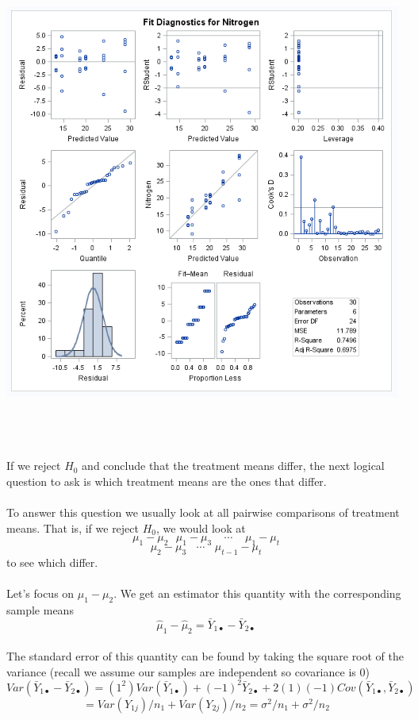 	\begin{center}
	\includegraphics[scale=0.8]{cloveranova4}
  \end{center}

\newpage
~\\~\\~\\
If we reject $H_0$ and conclude that the treatment means differ, the next logical question to ask is which treatment means are the ones that differ.  \\~\\

To answer this question we usually look at all pairwise comparisons of treatment means.  That is, if we reject $H_0$, we would look at 
$$\mu_1-\mu_2~~~\mu_1-\mu_3~~~~~\cdots~~~~~\mu_1-\mu_t$$
$$\mu_2-\mu_3~~~~\cdots~~~~ \mu_{t-1}-\mu_{t}$$
to see which differ.\\~\\

Let's focus on $\mu_1-\mu_2$.  We get an estimator this quantity with the corresponding sample means
$$\hat{\mu}_{1}-\hat{\mu}_{2}=\bar{Y}_{1\bullet}-\bar{Y}_{2\bullet}$$~\\

The standard error of this quantity can be found by taking the square root of the variance (recall we assume our samples are independent so covariance is 0)
$$Var(\bar{Y}_{1\bullet}-\bar{Y}_{2\bullet}) = (1^2)Var(\bar{Y}_{1\bullet})+(-1)^2\bar{Y}_{2\bullet}+2(1)(-1)Cov(\bar{Y}_{1\bullet},\bar{Y}_{2\bullet})$$
$$=Var(Y_{1j})/n_1+Var(Y_{2j})/n_2 = \sigma^2/n_1+\sigma^2/n_2$$~\\


